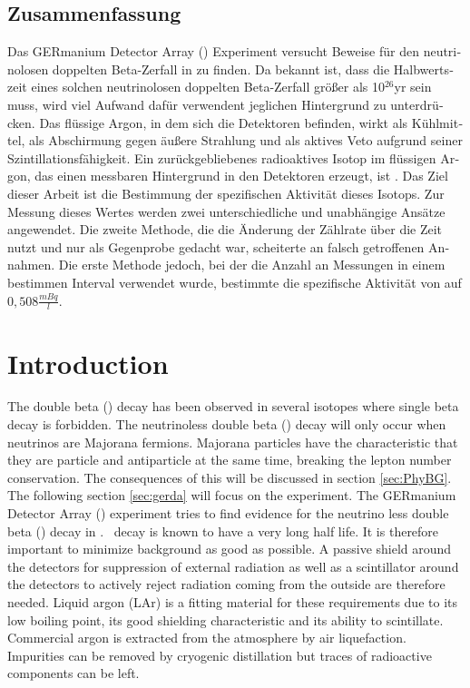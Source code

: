 \documentclass[encoding=utf8,british]{tumphthesis}
\begin{document}
\begin{otherlanguage}{ngerman}
\chapter*{Zusammenfassung}
Das GERmanium Detector Array (\gerda) Experiment versucht Beweise für den neutrinolosen doppelten Beta-Zerfall in  zu finden.
Da bekannt ist, dass die Halbwertszeit eines solchen neutrinolosen doppelten Beta-Zerfall größer als 10$^{26}$yr sein muss, wird viel Aufwand dafür verwendent jeglichen Hintergrund zu unterdrücken.
Das flüssige Argon, in dem sich die Detektoren befinden, wirkt als Kühlmittel, als Abschirmung gegen äußere Strahlung und als aktives Veto aufgrund seiner Szintillationsfähigkeit.
Ein zurückgebliebenes radioaktives Isotop im flüssigen Argon, das einen messbaren Hintergrund in den Detektoren erzeugt, ist .
Das Ziel dieser Arbeit ist die Bestimmung der spezifischen Aktivität dieses Isotops.
Zur Messung dieses Wertes werden zwei unterschiedliche und unabhängige Ansätze angewendet.
Die zweite Methode, die die Änderung der Zählrate über die Zeit nutzt und nur als Gegenprobe gedacht war, scheiterte an falsch getroffenen Annahmen.
Die erste Methode jedoch, bei der die Anzahl an Messungen in einem bestimmen Interval verwendet wurde, bestimmte die spezifische Aktivität von  auf $0,508\frac{mBq} {\unit{l}}$.
\end{otherlanguage}

\tableofcontents

\mainmatter

\chapter{Introduction}
\label{sec:intro}

The double beta (\twonu) decay has been observed in several isotopes where single beta decay is forbidden.
The neutrinoless double beta (\onbb) decay will only occur when neutrinos are Majorana fermions.
Majorana particles have the characteristic that they are particle and antiparticle at the same time, breaking the lepton number conservation.
The consequences of this will be discussed in  section \ref{sec:PhyBG}.
\\

The following section \ref{sec:gerda} will focus on the \gerda experiment.
The GERmanium Detector Array (\gerda) experiment tries to find evidence for the neutrino less double beta (\onbb) decay in .
\onbb\ decay is known to have a very long half life.
It is therefore important to minimize background as good as possible. 
A passive shield around the detectors for suppression of external radiation as well as a scintillator around the detectors to actively reject radiation coming from the outside are therefore needed.
Liquid argon (LAr) is a fitting material for these requirements due to its low boiling point, its good shielding characteristic and its ability to scintillate. 
Commercial argon is extracted from the atmosphere by air liquefaction. 
Impurities can be removed by cryogenic distillation but traces of radioactive components can be left.
\\
\end{document}
